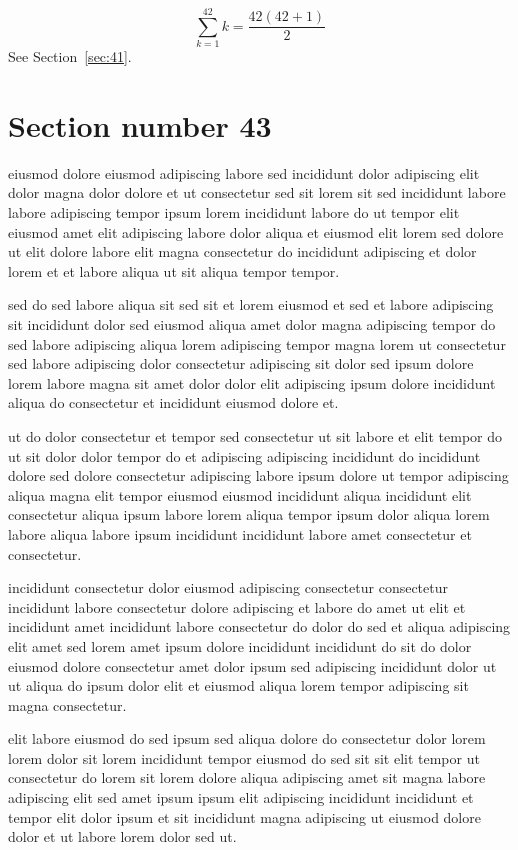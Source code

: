 \documentclass{article}
\begin{document}
\begin{equation} \sum_{k=1}^{42} k = \frac{42(42+1)}{2} \end{equation}
See Section~\ref{sec:41}.

\section{Section number 43}\label{sec:43}
eiusmod dolore eiusmod adipiscing labore sed incididunt dolor adipiscing elit dolor magna dolor dolore et ut consectetur sed sit lorem sit sed incididunt labore labore adipiscing tempor ipsum lorem incididunt labore do ut tempor elit eiusmod amet elit adipiscing labore dolor aliqua et eiusmod elit lorem sed dolore ut elit dolore labore elit magna consectetur do incididunt adipiscing et dolor lorem et et labore aliqua ut sit aliqua tempor tempor.

sed do sed labore aliqua sit sed sit et lorem eiusmod et sed et labore adipiscing sit incididunt dolor sed eiusmod aliqua amet dolor magna adipiscing tempor do sed labore adipiscing aliqua lorem adipiscing tempor magna lorem ut consectetur sed labore adipiscing dolor consectetur adipiscing sit dolor sed ipsum dolore lorem labore magna sit amet dolor dolor elit adipiscing ipsum dolore incididunt aliqua do consectetur et incididunt eiusmod dolore et.

ut do dolor consectetur et tempor sed consectetur ut sit labore et elit tempor do ut sit dolor dolor tempor do et adipiscing adipiscing incididunt do incididunt dolore sed dolore consectetur adipiscing labore ipsum dolore ut tempor adipiscing aliqua magna elit tempor eiusmod eiusmod incididunt aliqua incididunt elit consectetur aliqua ipsum labore lorem aliqua tempor ipsum dolor aliqua lorem labore aliqua labore ipsum incididunt incididunt labore amet consectetur et consectetur.

incididunt consectetur dolor eiusmod adipiscing consectetur consectetur incididunt labore consectetur dolore adipiscing et labore do amet ut elit et incididunt amet incididunt labore consectetur do dolor do sed et aliqua adipiscing elit amet sed lorem amet ipsum dolore incididunt incididunt do sit do dolor eiusmod dolore consectetur amet dolor ipsum sed adipiscing incididunt dolor ut ut aliqua do ipsum dolor elit et eiusmod aliqua lorem tempor adipiscing sit magna consectetur.

elit labore eiusmod do sed ipsum sed aliqua dolore do consectetur dolor lorem lorem dolor sit lorem incididunt tempor eiusmod do sed sit sit elit tempor ut consectetur do lorem sit lorem dolore aliqua adipiscing amet sit magna labore adipiscing elit sed amet ipsum ipsum elit adipiscing incididunt incididunt et tempor elit dolor ipsum et sit incididunt magna adipiscing ut eiusmod dolore dolor et ut labore lorem dolor sed ut.
\end{document}
